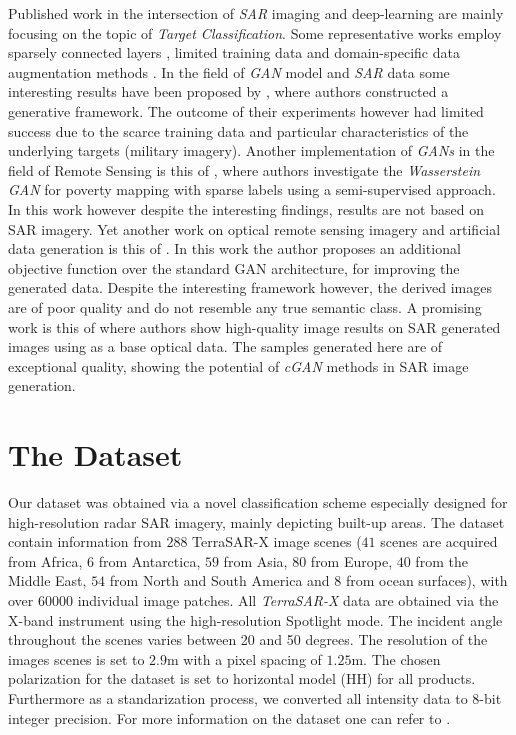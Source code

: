 \documentclass{article}
\begin{document}
Published work in the intersection of \emph{SAR} imaging
and deep-learning are mainly focusing on the topic of \emph{Target 
Classification}. Some representative works employ sparsely connected layers 
\cite{chen2016target}, limited training data 
\cite{lin2017deep} and domain-specific data augmentation 
methods \cite{ding2016convolutional}.
%
%
In the field of \emph{GAN} model and \emph{SAR} data some interesting 
results have been proposed by \cite{guo2017synthetic}, where
authors constructed a generative framework.
%
The outcome of their experiments however had limited success due to the
scarce training data and particular characteristics of the underlying 
targets (military imagery). 
%
Another implementation of \emph{GANs} in the field 
of Remote Sensing is this of \cite{perezsemi}, where authors investigate the 
\emph{Wasserstein GAN} for poverty mapping with sparse labels using a 
semi-supervised approach. In this work however despite the interesting 
findings, results are not based on SAR imagery.
%
Yet another work on optical remote sensing imagery and artificial data 
generation is this of \cite{lin2016deep}. In this work the author proposes
an additional objective function over the standard GAN architecture, 
for improving the generated data. Despite the interesting framework however, 
the derived images are of poor quality and do not resemble any true semantic class.
%
A promising work is this of \cite{merkle2017possibility} where authors 
show high-quality image results on SAR generated images using as a 
base optical data.
%
The samples generated here are of exceptional quality, 
showing the potential of \emph{cGAN} 
methods in SAR image generation.

\section{The Dataset}
\label{sec:dataset}

Our dataset was obtained via a novel 
classification scheme especially designed
for high-resolution radar SAR imagery,  
mainly depicting built-up areas. 
%
The dataset contain information from $288$ 
TerraSAR-X image scenes ($41$ 
scenes are acquired from Africa, $6$ from 
Antarctica, $59$ from Asia, $80$ from Europe, 
$40$ from the Middle East, $54$ from North 
and South America and $8$ from ocean 
surfaces), with over $60000$ 
individual image patches.
%
All \emph{TerraSAR-X} data are obtained via
the X-band instrument using the high-resolution
Spotlight mode. The incident angle throughout the 
scenes varies between 20 and 50 degrees. The resolution
of the images scenes is set to $2.9$m with a pixel 
spacing of $1.25$m. 
The chosen polarization for the dataset
is set to horizontal model (HH) for all products.
Furthermore as a standarization process, we converted all
intensity data to 8-bit integer precision. 
% 
For more information on the dataset one can refer to
\cite{dumitru2016land}.
\end{document}
